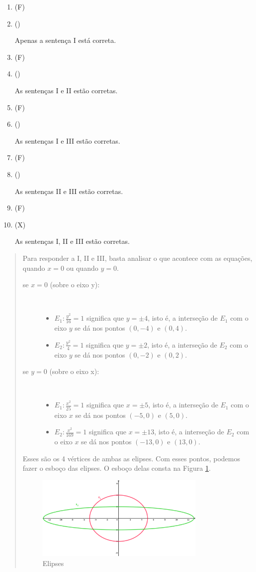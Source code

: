 \documentclass[12pt,a4paper]{article}
\newenvironment{ans}{\color{blue}\begin{quote}}{\end{quote}}
\newif \ifans
\newif \ifvf
\newcommand{\alt}{
	\ifvf
		\ifans
			\item({\sf\color{ForestGreen}V})
		\else 
			\item({\sf\color{Orange}F}) 
		\fi
	\else
		\ifans
			\item({\sf\color{Cyan}X})
		\else 
			\item({\sf\phantom{X}}) 
		\fi	
	\fi	
	\ansfalse
	\vffalse
}
\def\X{\anstrue}
\begin{document}
\begin{enumerate}
	\begin{enumerate}
	\alt Apenas a sentença I está correta.
	\alt As sentenças I e II estão corretas.
	\alt As sentenças I e III estão corretas.
	\alt As sentenças II e III estão corretas.
	\X\alt As sentenças I, II e III estão corretas.
	\end{enumerate}
	
	\begin{ans}
	Para responder a I, II e III, basta analisar o que acontece com as equações, quando $x=0$ ou quando $y=0$.
		\begin{description}
		\item[se $x=0$ (sobre o eixo y):] \ 
			\begin{itemize}
			\item $E_1:\frac{y^2}{16}=1$ significa que $y=\pm 4$, isto é, a interseção de $E_1$ com o eixo $y$ se dá nos pontos $(0,-4)$ e $(0,4)$.
			\item $E_2:\frac{y^2}{4}=1$ significa que $y=\pm 2$, isto é, a interseção de $E_2$ com o eixo $y$ se dá nos pontos $(0,-2)$ e $(0,2)$.
			\end{itemize}
		\item[se $y=0$ (sobre o eixo x):] \ 
		\begin{itemize}
			\item $E_1:\frac{x^2}{25}=1$ significa que $x=\pm 5$, isto é, a interseção de $E_1$ com o eixo $x$ se dá nos pontos $(-5,0)$ e $(5,0)$.
			\item $E_2:\frac{x^2}{169}=1$ significa que $x=\pm 13$, isto é, a interseção de $E_2$ com o eixo $x$ se dá nos pontos $(-13,0)$ e $(13,0)$.
			\end{itemize}
		\end{description}
		Esses são os 4 vértices de ambas as elipses. Com esses pontos, podemos fazer o esboço das elipses. O esboço delas consta na Figura \ref{elipses}. 
		
		\begin{figure}[H]\centering
		\includegraphics[width=0.8\textwidth]{fig}
		\caption{Elipses}\label{elipses}
		\end{figure}
	

\end{ans}
\end{enumerate}
\end{document}
